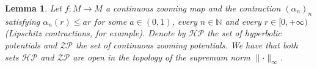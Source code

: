 \documentclass[12pt,a4paper]{amsart}
\theoremstyle{plain}
\newtheorem{lemma}{Lemma}[subsection]
\begin{document}
\begin{lemma} \label{OPEN}
	Let $f:M \to M$ a continuous zooming map and the contraction $(\alpha_{n})_{n}$ satisfying $\alpha_{n}(r) \leq ar$ for some $a \in (0,1)$, every $n \in \mathbb{N}$ and every $r \in [0,+\infty)$ (Lipschitz contractions, for example). Denote by $\mathcal{HP}$ the set of hyperbolic potentials and $\mathcal{ZP}$ the set of continuous zooming potentials. We have that both sets $\mathcal{HP}$ and $\mathcal{ZP}$ are open in the topology of the supremum norm $\parallel \cdot \parallel_{\infty}$. 
\end{lemma}
\end{document}
